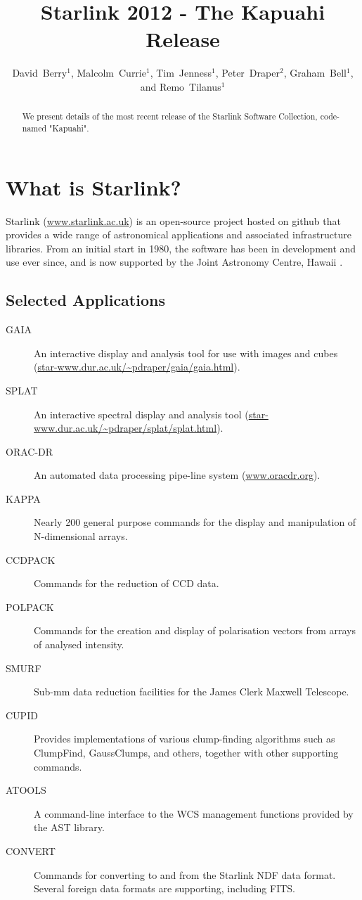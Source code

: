 \documentclass[11pt,twoside]{article}
\begin{document}
\title{Starlink 2012 - The Kapuahi Release}

\author{David~Berry$^1$, Malcolm~Currie$^1$, Tim~Jenness$^1$, Peter~Draper$^2$, Graham~Bell$^1$, and Remo~Tilanus$^1$
}

\begin{abstract}
We present details of the most recent release of the Starlink Software
Collection, code-named "Kapuahi".
\end{abstract}

\section{What is Starlink?}

Starlink (\url{www.starlink.ac.uk}) is an open-source project hosted on
github that provides a wide range of astronomical applications and
associated infrastructure libraries. From an initial start in 1980, the
software has been in development and use ever since, and is
now supported by the Joint Astronomy Centre, Hawaii
\citep{SSC_2009}.

\subsection{Selected Applications}
\begin{description}
\item[GAIA] An interactive display and analysis tool for use with images and
cubes (\url{star-www.dur.ac.uk/~pdraper/gaia/gaia.html}).
\item[SPLAT] An interactive spectral display and analysis tool (\url{star-www.dur.ac.uk/~pdraper/splat/splat.html}).
\item[ORAC-DR] An automated data processing pipe-line system
(\url{www.oracdr.org}).
\item[KAPPA] Nearly 200 general purpose commands for the display and manipulation of N-dimensional arrays.
\item[CCDPACK] Commands for the reduction of CCD data.
\item[POLPACK] Commands for the creation and display of polarisation vectors from arrays of analysed intensity.
\item[SMURF] Sub-mm data reduction facilities for the James Clerk Maxwell Telescope.
\item[CUPID] Provides implementations of various clump-finding algorithms such as ClumpFind, GaussClumps, and others, together with other supporting commands.
\item[ATOOLS] A command-line interface to the WCS management functions provided by the AST library.
\item[CONVERT] Commands for converting to and from the Starlink NDF data format. Several foreign data formats are supporting, including FITS.
\end{description}
\end{document}
